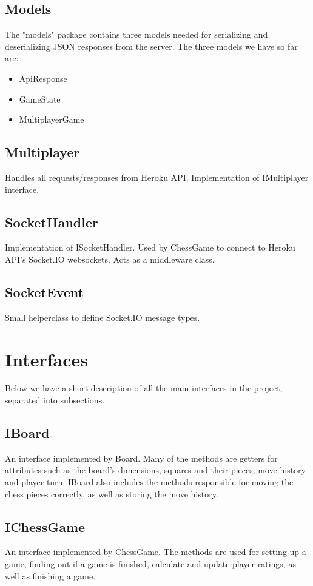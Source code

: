 \documentclass{article}
\begin{document}
\subsection {Models}
The "models" package contains three models needed for serializing and deserializing JSON responses from the server.
The three models we have so far are:
\begin{itemize}  
\item ApiResponse
\item GameState
\item MultiplayerGame
\end{itemize}

\subsection {Multiplayer}
Handles all requests/responses from Heroku API. Implementation of IMultiplayer interface.

\subsection {SocketHandler}
Implementation of ISocketHandler. Used by ChessGame to connect to Heroku API's Socket.IO websockets.
Acts as a middleware class.

\subsection {SocketEvent}
Small helperclass to define Socket.IO message types.

\section {Interfaces}
Below we have a short description of all the main interfaces in the project, separated into subsections.

\subsection {IBoard}
An interface implemented by Board. Many of the methods are getters for attributes such as the board's dimensions, squares and their pieces, move history and player turn. IBoard also includes the methods responsible for moving the chess pieces correctly, as well as storing the move history.

\subsection {IChessGame}
An interface implemented by ChessGame. The methods are used for setting up a game, finding out if a game is finished, calculate and update player ratings, as well as finishing a game. 
\end{document}
